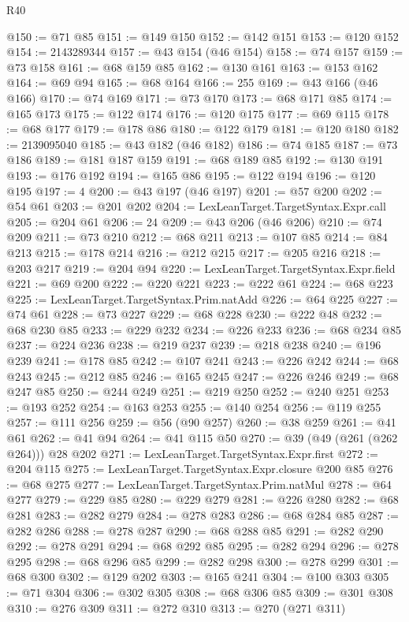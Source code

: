 \begin{lexlean}{R40}
\begin{coremodule}
@150 := @71 @85
@151 := @149 @150
@152 := @142 @151
@153 := @120 @152
@154 := 2143289344
@157 := @43 @154 (@46 @154)
@158 := @74 @157
@159 := @73 @158
@161 := @68 @159 @85
@162 := @130 @161
@163 := @153 @162
@164 := @69 @94
@165 := @68 @164
@166 := 255
@169 := @43 @166 (@46 @166)
@170 := @74 @169
@171 := @73 @170
@173 := @68 @171 @85
@174 := @165 @173
@175 := @122 @174
@176 := @120 @175
@177 := @69 @115
@178 := @68 @177
@179 := @178 @86
@180 := @122 @179
@181 := @120 @180
@182 := 2139095040
@185 := @43 @182 (@46 @182)
@186 := @74 @185
@187 := @73 @186
@189 := @181 @187 @159
@191 := @68 @189 @85
@192 := @130 @191
@193 := @176 @192
@194 := @165 @86
@195 := @122 @194
@196 := @120 @195
@197 := 4
@200 := @43 @197 (@46 @197)
@201 := @57 @200
@202 := @54 @61
@203 := @201 @202
@204 := LexLeanTarget.TargetSyntax.Expr.call
@205 := @204 @61
@206 := 24
@209 := @43 @206 (@46 @206)
@210 := @74 @209
@211 := @73 @210
@212 := @68 @211
@213 := @107 @85
@214 := @84 @213
@215 := @178 @214
@216 := @212 @215
@217 := @205 @216
@218 := @203 @217
@219 := @204 @94
@220 := LexLeanTarget.TargetSyntax.Expr.field
@221 := @69 @200
@222 := @220 @221
@223 := @222 @61
@224 := @68 @223
@225 := LexLeanTarget.TargetSyntax.Prim.natAdd
@226 := @64 @225
@227 := @74 @61
@228 := @73 @227
@229 := @68 @228
@230 := @222 @48
@232 := @68 @230 @85
@233 := @229 @232
@234 := @226 @233
@236 := @68 @234 @85
@237 := @224 @236
@238 := @219 @237
@239 := @218 @238
@240 := @196 @239
@241 := @178 @85
@242 := @107 @241
@243 := @226 @242
@244 := @68 @243
@245 := @212 @85
@246 := @165 @245
@247 := @226 @246
@249 := @68 @247 @85
@250 := @244 @249
@251 := @219 @250
@252 := @240 @251
@253 := @193 @252
@254 := @163 @253
@255 := @140 @254
@256 := @119 @255
@257 := @111 @256
@259 := @56 (@90 @257)
@260 := @38 @259
@261 := @41 @61
@262 := @41 @94
@264 := @41 @115 @50
@270 := @39 (@49 (@261 (@262 @264))) @28 @202
@271 := LexLeanTarget.TargetSyntax.Expr.first
@272 := @204 @115
@275 := LexLeanTarget.TargetSyntax.Expr.closure @200 @85
@276 := @68 @275
@277 := LexLeanTarget.TargetSyntax.Prim.natMul
@278 := @64 @277
@279 := @229 @85
@280 := @229 @279
@281 := @226 @280
@282 := @68 @281
@283 := @282 @279
@284 := @278 @283
@286 := @68 @284 @85
@287 := @282 @286
@288 := @278 @287
@290 := @68 @288 @85
@291 := @282 @290
@292 := @278 @291
@294 := @68 @292 @85
@295 := @282 @294
@296 := @278 @295
@298 := @68 @296 @85
@299 := @282 @298
@300 := @278 @299
@301 := @68 @300
@302 := @129 @202
@303 := @165 @241
@304 := @100 @303
@305 := @71 @304
@306 := @302 @305
@308 := @68 @306 @85
@309 := @301 @308
@310 := @276 @309
@311 := @272 @310
@313 := @270 (@271 @311)

\end{coremodule}
\end{lexlean}
